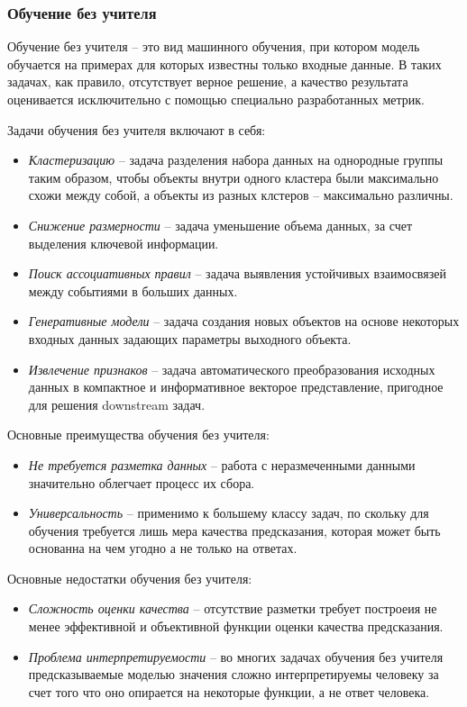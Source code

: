 \documentclass[../part_1.tex]{subfiles}
\begin{document}
\subsubsection{Обучение без учителя} 
    \label{sec:without_teacher}
    \par Обучение без учителя --  это вид машинного обучения, при котором модель обучается на примерах для которых известны только входные данные. В таких задачах, как правило, отсутствует верное решение, а качество результата оценивается исключительно с помощью специально разработанных метрик.
    \par Задачи обучения без учителя включают в себя:
    \begin{itemize}
        \item \textit{Кластеризацию} -- задача разделения набора данных на однородные группы таким образом, чтобы объекты внутри одного кластера были максимально схожи между собой, а объекты из разных клстеров -- максимально различны.
        \item \textit{Снижение размерности} -- задача уменьшение объема данных, за счет выделения ключевой информации.
        \item \textit{Поиск ассоциативных правил} -- задача выявления устойчивых взаимосвязей между событиями в больших данных.
        \item \textit{Генеративные модели} -- задача создания новых объектов на основе некоторых входных данных задающих параметры выходного объекта.
        \item \textit{Извлечение признаков} -- задача автоматического преобразования исходных данных в компактное и информативное векторое представление, пригодное для решения downstream задач.
    \end{itemize}
    \par Основные преимущества обучения без учителя:
    \begin{itemize}
        \item \textit{Не требуется разметка данных} -- работа с неразмеченными данными значительно облегчает процесс их сбора.
        \item \textit{Универсальность} -- применимо к большему классу задач, по скольку для обучения требуется лишь мера качества предсказания, которая может быть основанна на чем угодно а не только на ответах.
    \end{itemize}
    \par Основные недостатки обучения без учителя:
    \begin{itemize}
        \item \textit{Сложность оценки качества} -- отсутствие разметки требует построеия не менее эффективной и объективной функции оценки качества предсказания.
        \item \textit{Проблема интерпретируемости} -- во многих задачах обучения без учителя предсказываемые моделью значения сложно интерпретируемы человеку за счет того что оно опирается на некоторые функции, а не ответ человека.
    \end{itemize}
\end{document}

